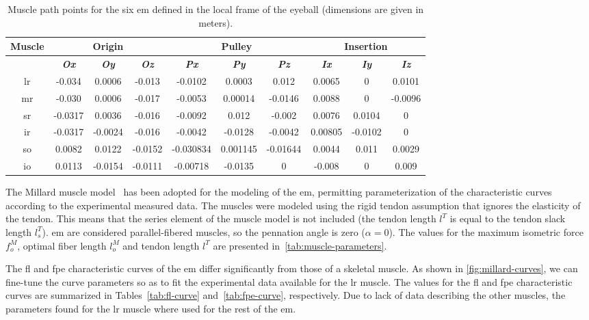 \documentclass[11pt,a4paper,draft=false]{report}
\begin{document}
\begin{table}[ht]
  \centering
  \caption{Muscle path points for the six \gls{em} defined in the local frame of
    the eyeball (dimensions are given in meters).}\label{tab:muscle-path}
  \begin{tabular}{@{}cccccccccc@{}}
    \toprule
    \textbf{Muscle}
    & \multicolumn{3}{c}{\textbf{Origin}}
    & \multicolumn{3}{c}{\textbf{Pulley}}
    & \multicolumn{3}{c}{\textbf{Insertion}} \\
    \midrule
    & \textit{\textbf{Ox}} & \textit{\textbf{Oy}} & \textit{\textbf{Oz}}
    & \textit{\textbf{Px}} & \textit{\textbf{Py}} & \textit{\textbf{Pz}}
    & \textit{\textbf{Ix}} & \textit{\textbf{Iy}} & \textit{\textbf{Iz}} \\
    \midrule
    \gls{lr} & -0.034 & 0.0006 & -0.013 & -0.0102 & 0.0003 & 0.012 & 0.0065 & 0 & 0.0101 \\
    \gls{mr} & -0.030 & 0.0006 & -0.017 & -0.0053 & 0.00014 & -0.0146 & 0.0088 & 0 & -0.0096 \\
    \gls{sr} & -0.0317 & 0.0036 & -0.016 & -0.0092 & 0.012 & -0.002 & 0.0076 & 0.0104 & 0 \\
    \gls{ir} & -0.0317 & -0.0024 & -0.016 & -0.0042 & -0.0128 & -0.0042 & 0.00805 & -0.0102 & 0 \\
    \gls{so} & 0.0082 & 0.0122 & -0.0152 & -0.030834 & 0.001145 & -0.01644 & 0.0044 & 0.011 & 0.0029 \\
    \gls{io} & 0.0113 & -0.0154 & -0.0111 & -0.00718 & -0.0135 & 0 & -0.008 & 0 & 0.009 \\
    \bottomrule
  \end{tabular}
\end{table}

The Millard muscle model~\cite{Millard2013} has been adopted for the modeling of
the \gls{em}, permitting parameterization of the characteristic curves according
to the experimental measured data. The muscles were modeled using the rigid
tendon assumption that ignores the elasticity of the tendon. This means that the
series element of the muscle model is not included (the tendon length $l^T$ is
equal to the tendon slack length $l_s^T$). \gls{em} are considered
parallel-fibered muscles, so the pennation angle is zero ($\alpha = 0$). The
values for the maximum isometric force $f_o^M$, optimal fiber length $l_o^M$ and
tendon length $l^T$ are presented in~\autoref{tab:muscle-parameters}.

The \gls{fl} and \gls{fpe} characteristic curves of the \gls{em} differ
significantly from those of a skeletal muscle. As shown in
\autoref{fig:millard-curves}, we can fine-tune the curve parameters so as to fit
the experimental data available for the \gls{lr} muscle. The values for the
\gls{fl} and \gls{fpe} characteristic curves are summarized in
Tables~\ref{tab:fl-curve} and~\ref{tab:fpe-curve}, respectively. Due to lack of
data describing the other muscles, the parameters found for the \gls{lr} muscle
where used for the rest of the \gls{em}.
\end{document}
